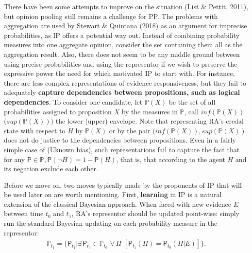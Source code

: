 \documentclass[
  10pt,
  dvipsnames,enabledeprecatedfontcommands]{scrartcl}
\begin{document}
There have been some attempts to improve on the situation (List \&
Pettit, 2011), but opinion pooling still remains a challenge for PP. The
problems with aggregation are used by Stewart \& Quintana (2018) as an
argument for imprecise probabilities, as IP offers a potential way out.
Instead of combining probability measures into one aggregate opinion,
consider the set containing them all as the aggregation result. Also,
there does not seem to be any middle ground between using precise
probabilities and using the representor if we wish to preserve the
expressive power the need for which motivated IP to start with. For
instance, there are less complex representations of evidence
responsiveness, but they fail to adequately
\textbf{capture dependencies between propositions, such as logical dependencies}.
To consider one candidate, let \(\mathbb{P}(X)\) be the set of all
probabilities assigned to proposition \(X\) by the measures in
\(\mathbb{P}\), call \(inf(\mathbb{P}(X))\) (\(sup (\mathbb{P}(X))\))
the lower (upper) envelope. Note that representing RA's credal state
with respect to \(H\) by \(\mathbb{P}(X)\) or by the pair
\((inf(\mathbb{P}(X)),sup (\mathbb{P}(X))\) does not do justice to the
dependencies between propositions. Even in a fairly simple case of
(Uknown bias), such representations fail to capture the fact that for
any \(\mathsf{P}\in \mathbb{P}, \mathsf{P}(\neg H) = 1- \mathsf{P}(H)\),
that is, that according to the agent \(H\) and its negation exclude each
other.

Before we move on, two moves typically made by the proponents of IP that
will be used later on are worth mentioning. First, \textbf{learning} in
IP is a natural extension of the classical Bayesian approach. When faced
with new evidence \(E\) between time \(t_0\) and \(t_1\), RA's
representor should be updated point-wise: simply run the standard
Bayesian updating on each probability measure in the representor:
\begin{align*} \label{eq:updateRepresentor}
\mathbb{P}_{t_1} = \{\mathsf{P}_{t_1}\vert \exists\, {\mathsf{P}_{t_0} \!\in  \mathbb{P}_{t_0}}\,\, \forall\, {H}\,\, \left[\mathsf{P}_{t_1}(H)=\mathsf{P}_{t_0}(H \vert E)\right] \}.
\end{align*}
\end{document}
